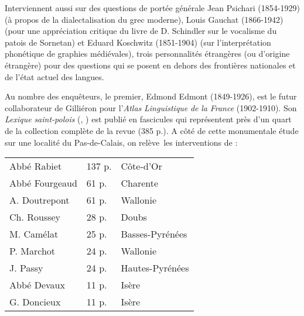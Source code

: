 \documentclass[output=paper]{langsci/langscibook}
\begin{document}
Interviennent aussi sur des questions de portée générale Jean Psichari (1854-1929) (à propos de la dialectalisation du grec moderne), Louis Gauchat (1866-1942) (pour une appréciation critique du livre de D. Schindler sur le vocalisme du patois de Sornetan) et Eduard Koschwitz (1851-1904) (sur l’interprétation phonétique de graphies médiévales), trois personnalités étrangères (ou d’origine étrangère) pour des questions qui se posent en dehors des frontières nationales et de l’état actuel des langues.

Au nombre des enquêteurs, le premier, Edmond Edmont (1849-1926), est le futur collaborateur de Gilliéron pour l’\textit{Atlas} \textit{Linguistique} \textit{de} \textit{la} \textit{France} (1902-1910). Son \textit{Lexique} \textit{saint-polois} (\citeyear{edmont_lexique_1887}, \citeyear{edmont_lexique_1897}) est publié en fascicules qui représentent près d’un quart de la collection complète de la revue (385 p.). A côté de cette monumentale étude sur une localité du Pas-de-Calais, on relève~les interventions de : \\

\begin{table}[]
    \centering
\begin{tabularx}{\textwidth}{X X X}

Abbé Rabiet  &   137 p.   &  Côte-d’Or \\

Abbé Fourgeaud  &   61 p.  &  Charente \\

  A. Doutrepont  &     61 p.  &  Wallonie \\

  Ch. Roussey   &   28 p.  &  Doubs \\

  M. Camélat  &    25 p.  &  Basses-Pyrénées \\

  P. Marchot  &    24 p.  &  Wallonie \\

  J. Passy    &  24 p.  &  Hautes-Pyrénées \\

  Abbé Devaux    &   11 p.  &  Isère  \\

  G. Doncieux   &   11 p.  &  Isère \\
  
 \end{tabularx} 
 \end{table}
 \\
 
\end{document}
